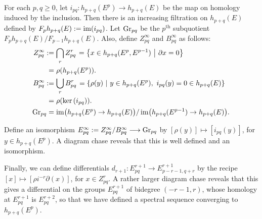 \documentclass[11pt]{article}
\begin{document}
\begin{Leray Serre Hirzebruch SS}
For each $p,q\geq0$, let $i_{pq}:h_{p+q}(E^p)\to h_{p+q}(E)$ be the map on homology induced by the inclusion. Then there is an increasing filtration on $h_{p+q}(E)$ defined by $F_{p}h_{p+q}(E):=\operatorname{im}(i_{pq})$. Let $\textup{Gr}_{pq}$ be the $p^\text{th}$ subquotient $F_{p}h_{p+q}(E)/F_{p-1}h_{p+q}(E)$. Also, define $Z^\infty_{pq}$ and $B^\infty_{pq}$ as follows:
\begin{alignat*}{2}
Z_{pq}^\infty:=&\left.\bigcap_r Z_{pq}^r\right.=\left\{x\in h_{p+q}(E^p,E^{p-1})\ \middle|\ \partial x=0\right\}\\
=&\left.\rho(h_{p+q}(E^p)).\right.\\
B_{pq}^\infty:=&\left.\bigcup_r B_{pq}^r\right.=\left\{\rho(y)\ \middle|\ y\in h_{p+q}(E^p),\ i_{pq}(y)=0\in h_{p+q}(E)\right\}\\
=&\left.\rho(\textup{ker}\, (i_{pq})).\right.\\
\textup{Gr}_{pq}=&\left.\operatorname{im}\bigl(h_{p+q}(E^p)\rightarrow h_{p+q}(E)\bigr)/\operatorname{im}\bigl(h_{p+q}(E^{p-1})\rightarrow h_{p+q}(E)\bigr).\right.
\end{alignat*}

Define an isomorphism $E^\infty_{pq}:= Z_{pq}^\infty/B_{pq}^\infty\longrightarrow \textup{Gr}_{pq}$
by $[\rho(y)]\mapsto[i_{pq}(y)]$, for $y\in h_{p+q}(E^p)$. A diagram chase reveals that this is well defined and an isomorphism.

Finally, we can define differentials $d_{r+1}:E^{r+1}_{pq}\to E^{r+1}_{p-r-1,q+r}$ by the recipe $[x]\mapsto [\rho i^{-r}\partial(x)]$, for $x\in Z_{pq}^{r}$. A rather larger diagram chase reveals that this gives a differential on the groups $E^{r+1}_{pq}$ of bidegree $(-r-1,r)$, whose homology at $E^{r+1}_{pq}$ is $E^{r+2}_{pq}$, so that we have defined a spectral sequence converging to $h_{p+q}(E^p)$.


\end{Leray Serre Hirzebruch SS}
\end{document}
